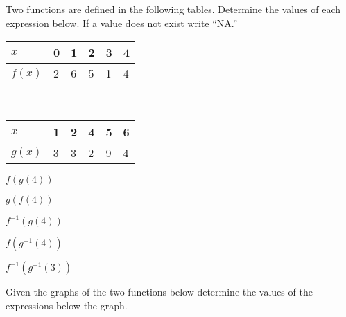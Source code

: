 \begin{problem}
\item Two functions are defined in the following tables. Determine the
  values of each expression below. If a value does not exist write
  ``NA.''

  \begin{tabular}[h]{l||l|l|l|l|l}
    $x$    & 0 & 1 & 2 & 3 & 4 \\ \hline
    $f(x)$ & 2 & 6 & 5 & 1 & 4 \\
  \end{tabular} ~~~
  \begin{tabular}[h]{l||l|l|l|l|l}
    $x$    & 1 & 2 & 4 & 5 & 6 \\ \hline
    $g(x)$ & 3 & 3 & 2 & 9 & 4 \\
  \end{tabular}

  \begin{subproblem}
  \item $f(g(4))$
    \vfill
  \item $g(f(4))$
    \vfill
  \item $f^{-1}(g(4))$
    \vfill
  \item $f(g^{-1}(4))$
    \vfill
  \item $f^{-1}(g^{-1}(3))$
    \vfill
  \end{subproblem}

  \clearpage

\item Given the graphs of the two functions below determine the values
  of the expressions below the graph.


\end{problem}
